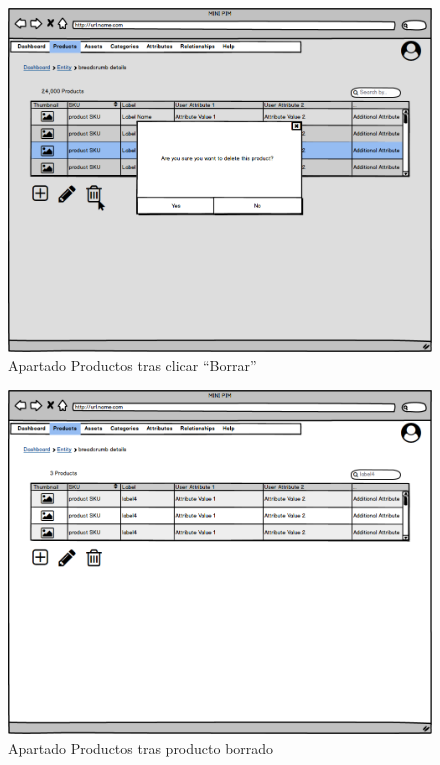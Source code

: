 \begin{figure}[H]
    \includegraphics[width=1\linewidth]{mockups/RF2-X Borrar Producto (Borrar Producto Paso1)V2.png}
    \caption{Apartado Productos tras clicar \enquote{Borrar}}
   \end{figure}
\vspace{1.0cm}

\begin{figure}[H]
    \includegraphics[width=1\linewidth]{mockups/RF2-X Borrar Producto (Borrar Producto Paso2).png}
    \caption{Apartado Productos tras producto borrado}
   \end{figure}
\vspace{1.0cm}

\newpage %